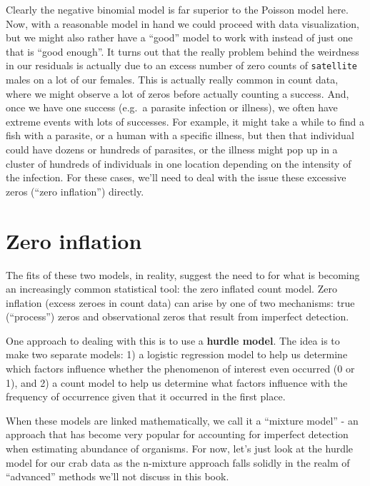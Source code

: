 \documentclass[
]{book}
\begin{document}
Clearly the negative binomial model is far superior to the Poisson model here. Now, with a reasonable model in hand we could proceed with data visualization, but we might also rather have a ``good'' model to work with instead of just one that is ``good enough''. It turns out that the really problem behind the weirdness in our residuals is actually due to an excess number of zero counts of \texttt{satellite} males on a lot of our females. This is actually really common in count data, where we might observe a lot of zeros before actually counting a success. And, once we have one success (e.g.~a parasite infection or illness), we often have extreme events with lots of successes. For example, it might take a while to find a fish with a parasite, or a human with a specific illness, but then that individual could have dozens or hundreds of parasites, or the illness might pop up in a cluster of hundreds of individuals in one location depending on the intensity of the infection. For these cases, we'll need to deal with the issue these excessive zeros (``zero inflation'') directly.

\hypertarget{zero-inflation}{%
\section{Zero inflation}\label{zero-inflation}}

The fits of these two models, in reality, suggest the need to for what is becoming an increasingly common statistical tool: the zero inflated count model. Zero inflation (excess zeroes in count data) can arise by one of two mechanisms: true (``process'') zeros and observational zeros that result from imperfect detection.

One approach to dealing with this is to use a \textbf{hurdle model}. The idea is to make two separate models: 1) a logistic regression model to help us determine which factors influence whether the phenomenon of interest even occurred (0 or 1), and 2) a count model to help us determine what factors influence with the frequency of occurrence given that it occurred in the first place.

When these models are linked mathematically, we call it a ``mixture model'' - an approach that has become very popular for accounting for imperfect detection when estimating abundance of organisms. For now, let's just look at the hurdle model for our crab data as the n-mixture approach falls solidly in the realm of ``advanced'' methods we'll not discuss in this book.
\end{document}
